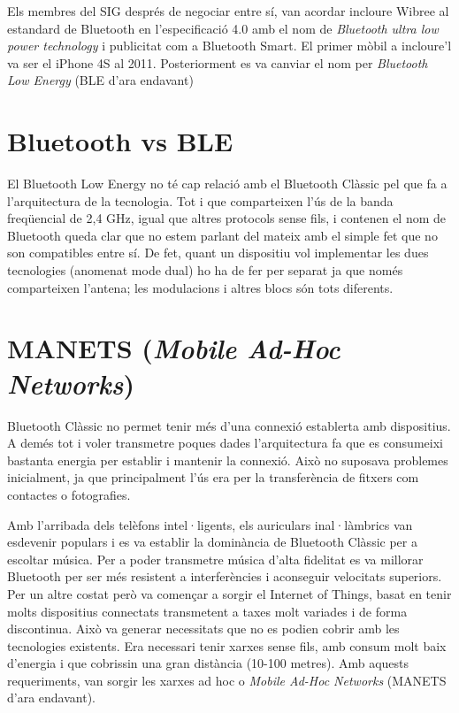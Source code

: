 Els membres del SIG després de negociar entre sí, van acordar incloure Wibree al estandard de Bluetooth en l'especificació 4.0 amb el nom de \textit{Bluetooth ultra low power technology} i publicitat com a Bluetooth Smart. El primer mòbil a incloure'l va ser el iPhone 4S al 2011.
Posteriorment es va canviar el nom per \textit{Bluetooth Low Energy} (BLE d'ara endavant)

\section{Bluetooth vs BLE}
El Bluetooth Low Energy no té cap relació amb el Bluetooth Clàssic pel que fa a l'arquitectura de la tecnologia.
Tot i que comparteixen l'ús de la banda freqüencial de 2,4 GHz, igual que altres protocols sense fils, i contenen el nom de Bluetooth queda clar que no estem parlant del mateix amb el simple fet que no son compatibles entre sí.
De fet, quant un dispositiu vol implementar les dues tecnologies (anomenat mode dual) ho ha de fer per separat ja que només comparteixen l'antena; les modulacions i altres blocs són tots diferents.

\section{MANETS (\textit{Mobile Ad-Hoc Networks})}
Bluetooth Clàssic no permet tenir més d'una connexió establerta amb dispositius.
A demés tot i voler transmetre poques dades l'arquitectura fa que es consumeixi bastanta energia per establir i mantenir la connexió.
Això no suposava problemes inicialment, ja que principalment l'ús era per la transferència de fitxers com contactes o fotografies.

Amb l'arribada dels telèfons intel·ligents, els auriculars inal·làmbrics van esdevenir populars i es va establir la dominància de Bluetooth Clàssic per a escoltar música.
Per a poder transmetre música d'alta fidelitat es va millorar Bluetooth per ser més resistent a interferències i aconseguir velocitats superiors.
Per un altre costat però va començar a sorgir el Internet of Things, basat en tenir molts dispositius connectats transmetent a taxes molt variades i de forma discontinua.
Això va generar necessitats que no es podien cobrir amb les tecnologies existents.
Era necessari tenir xarxes sense fils, amb consum molt baix d'energia i que cobrissin una gran distància (10-100 metres).
Amb aquests requeriments, van sorgir les xarxes ad hoc o \textit{Mobile Ad-Hoc Networks} (MANETS d'ara endavant).


